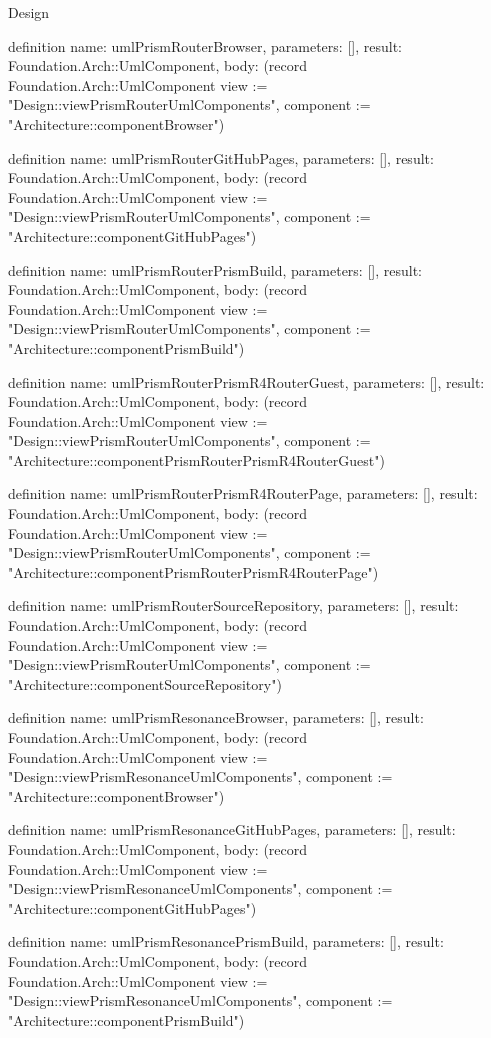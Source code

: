 \begin{lexlean}{Design}
\begin{semanticmodule}
definition{
  name: umlPrismRouterBrowser,
  parameters: [],
  result: Foundation.Arch::UmlComponent,
  body: (record Foundation.Arch::UmlComponent {view := "Design::viewPrismRouterUmlComponents", component := "Architecture::componentBrowser"})
}

definition{
  name: umlPrismRouterGitHubPages,
  parameters: [],
  result: Foundation.Arch::UmlComponent,
  body: (record Foundation.Arch::UmlComponent {view := "Design::viewPrismRouterUmlComponents", component := "Architecture::componentGitHubPages"})
}

definition{
  name: umlPrismRouterPrismBuild,
  parameters: [],
  result: Foundation.Arch::UmlComponent,
  body: (record Foundation.Arch::UmlComponent {view := "Design::viewPrismRouterUmlComponents", component := "Architecture::componentPrismBuild"})
}

definition{
  name: umlPrismRouterPrismR4RouterGuest,
  parameters: [],
  result: Foundation.Arch::UmlComponent,
  body: (record Foundation.Arch::UmlComponent {view := "Design::viewPrismRouterUmlComponents", component := "Architecture::componentPrismRouterPrismR4RouterGuest"})
}

definition{
  name: umlPrismRouterPrismR4RouterPage,
  parameters: [],
  result: Foundation.Arch::UmlComponent,
  body: (record Foundation.Arch::UmlComponent {view := "Design::viewPrismRouterUmlComponents", component := "Architecture::componentPrismRouterPrismR4RouterPage"})
}

definition{
  name: umlPrismRouterSourceRepository,
  parameters: [],
  result: Foundation.Arch::UmlComponent,
  body: (record Foundation.Arch::UmlComponent {view := "Design::viewPrismRouterUmlComponents", component := "Architecture::componentSourceRepository"})
}

definition{
  name: umlPrismResonanceBrowser,
  parameters: [],
  result: Foundation.Arch::UmlComponent,
  body: (record Foundation.Arch::UmlComponent {view := "Design::viewPrismResonanceUmlComponents", component := "Architecture::componentBrowser"})
}

definition{
  name: umlPrismResonanceGitHubPages,
  parameters: [],
  result: Foundation.Arch::UmlComponent,
  body: (record Foundation.Arch::UmlComponent {view := "Design::viewPrismResonanceUmlComponents", component := "Architecture::componentGitHubPages"})
}

definition{
  name: umlPrismResonancePrismBuild,
  parameters: [],
  result: Foundation.Arch::UmlComponent,
  body: (record Foundation.Arch::UmlComponent {view := "Design::viewPrismResonanceUmlComponents", component := "Architecture::componentPrismBuild"})
}


\end{semanticmodule}
\end{lexlean}
